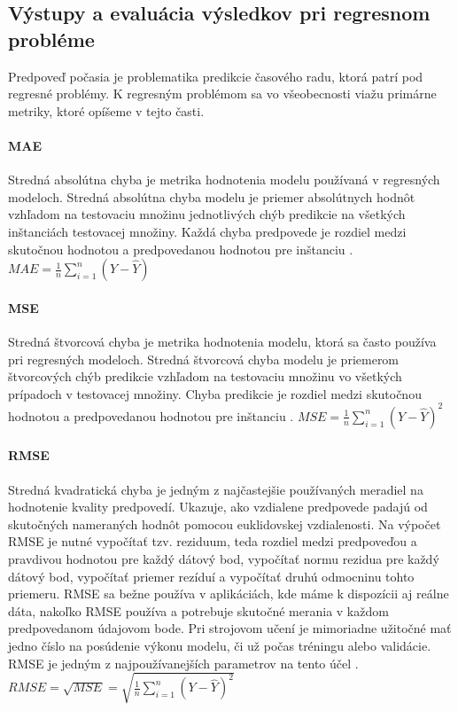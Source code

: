 \subsection{Výstupy a evaluácia výsledkov pri regresnom probléme}
\label{evaluacia}
Predpoveď počasia je problematika predikcie časového radu, ktorá patrí pod regresné problémy. K regresným problémom sa vo všeobecnosti viažu primárne metriky, ktoré opíšeme v tejto časti.
\paragraph{MAE} Stredná absolútna chyba je metrika hodnotenia modelu používaná v regresných modeloch. Stredná absolútna chyba modelu je priemer absolútnych hodnôt vzhľadom na testovaciu množinu jednotlivých chýb predikcie na všetkých inštanciách testovacej množiny. Každá chyba predpovede je rozdiel medzi skutočnou hodnotou a predpovedanou hodnotou pre inštanciu \cite{mae}. \newline
$MAE = {\frac{1}{n}\sum_{i=1}^{n}(Y-\widehat{Y})}$

\paragraph{MSE} Stredná štvorcová chyba je metrika hodnotenia modelu, ktorá sa často používa pri regresných modeloch. Stredná štvorcová chyba modelu je priemerom štvorcových chýb predikcie vzhľadom na testovaciu množinu vo všetkých prípadoch v testovacej množiny. Chyba predikcie je rozdiel medzi skutočnou hodnotou a predpovedanou hodnotou pre inštanciu \cite{mae}. \newline
$MSE = {\frac{1}{n}\sum_{i=1}^{n}(Y-\widehat{Y})^{2}}$

\paragraph{RMSE} Stredná kvadratická chyba je jedným z najčastejšie používaných meradiel na hodnotenie kvality predpovedí. Ukazuje, ako vzdialene predpovede padajú od skutočných nameraných hodnôt pomocou euklidovskej vzdialenosti. Na výpočet RMSE je nutné vypočítať tzv. reziduum, teda rozdiel medzi predpoveďou a pravdivou hodnotou pre každý dátový bod, vypočítať normu rezidua pre každý dátový bod, vypočítať priemer rezíduí a vypočítať druhú odmocninu tohto priemeru. RMSE sa bežne používa v aplikáciách, kde máme k dispozícii aj reálne dáta, nakoľko RMSE používa a potrebuje skutočné merania v každom predpovedanom údajovom bode. Pri strojovom učení je mimoriadne užitočné mať jedno číslo na posúdenie výkonu modelu, či už počas tréningu alebo validácie. RMSE je jedným z najpoužívanejších parametrov na tento účel \cite{rmse}. \newline
$RMSE = \sqrt{MSE} = \sqrt{\frac{1}{n}\sum_{i=1}^{n}(Y-\widehat{Y})^{2}}$

